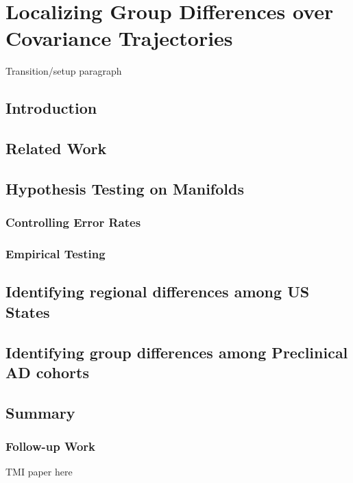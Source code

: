 \chapter{Localizing Group Differences over
Covariance Trajectories}\label{sec:covtraj}

Transition/setup paragraph

\section{Introduction}

\section{Related Work}

\section{Hypothesis Testing on Manifolds}

\subsection{Controlling Error Rates}

\subsection{Empirical Testing}

\section{Identifying regional differences among US States}

\section{Identifying group differences among Preclinical AD cohorts}

\section{Summary}

\subsection{Follow-up Work}
TMI paper here
